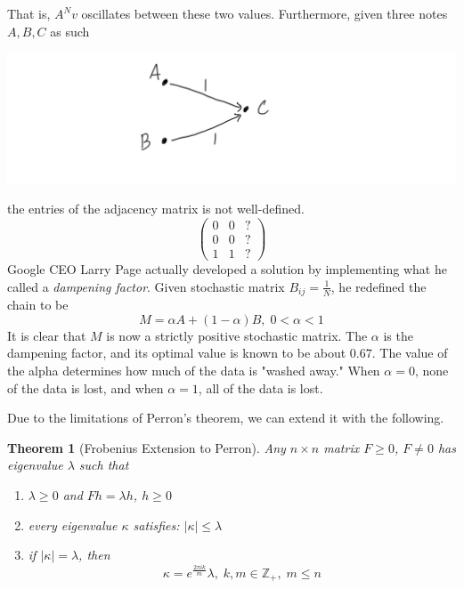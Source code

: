\documentclass{article}
\newtheorem{theorem}{Theorem}[section]
\theoremstyle{remark}
\theoremstyle{definition}
\begin{document}
That is, $A^N v$ oscillates between these two values. Furthermore, given three notes $A, B, C$ as such
\begin{center}
    \includegraphics[scale=0.25]{Images/Degeneratre_Markov_Chain.PNG} 
\end{center}
the entries of the adjacency matrix is not well-defined. 
\[ \begin{pmatrix} 0&0&? \\0&0&? \\1&1&?\end{pmatrix}\]
Google CEO Larry Page actually developed a solution by implementing what he called a \textit{dampening factor}. Given stochastic matrix $B_{i j} = \frac{1}{N}$, he redefined the chain to be 
\[M = \alpha A + (1-\alpha) B, \; 0< \alpha < 1\]
It is clear that $M$ is now a strictly positive stochastic matrix. The $\alpha$ is the dampening factor, and its optimal value is known to be about $0.67$. The value of the alpha determines how much of the data is "washed away." When $\alpha = 0$, none of the data is lost, and when $\alpha = 1$, all of the data is lost. 

Due to the limitations of Perron's theorem, we can extend it with the following.

\begin{theorem}[Frobenius Extension to Perron]
Any $n \times n$ matrix $F \geq 0$, $F \neq 0$ has eigenvalue $\lambda$ such that
\begin{enumerate}
    \item $\lambda \geq 0$ and $F h = \lambda h$, $h\geq 0$ \item every eigenvalue $\kappa$ satisfies: $|\kappa| \leq \lambda$ 
    \item if $|\kappa| = \lambda$, then 
\[\kappa = e^{\frac{2 \pi i k}{m}} \lambda, \; k, m \in \mathbb{Z}_+, \; m \leq n\]
\end{enumerate}
\end{theorem}
\end{document}
